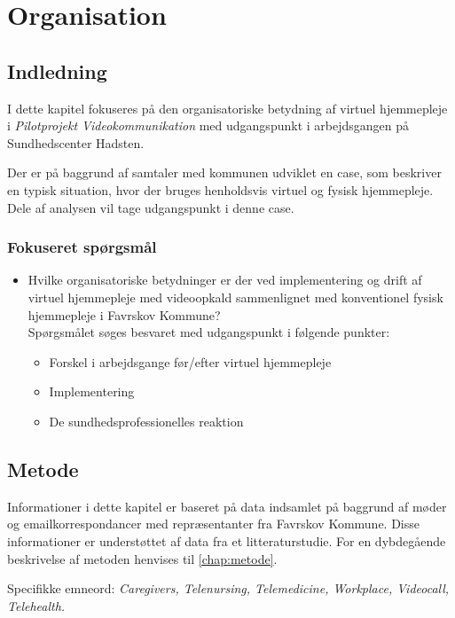 \chapter{Organisation}

\section{Indledning}
I dette kapitel fokuseres på den organisatoriske betydning af virtuel hjemmepleje i \textit{Pilotprojekt Videokommunikation} med udgangspunkt i arbejdsgangen på Sundhedscenter Hadsten. 

Der er på baggrund af samtaler med kommunen udviklet en case, som beskriver en typisk situation, hvor der bruges henholdsvis virtuel og fysisk hjemmepleje. Dele af analysen vil tage udgangspunkt i denne case. 

\subsection{Fokuseret spørgsmål}

\begin{itemize}
	\item Hvilke organisatoriske betydninger er der ved implementering og drift af virtuel hjemmepleje med videoopkald sammenlignet med konventionel fysisk hjemmepleje i Favrskov Kommune? \\Spørgsmålet søges besvaret med udgangspunkt i følgende punkter:
	\begin{itemize}
	\item Forskel i arbejdsgange før/efter virtuel hjemmepleje
	\item Implementering
	\item De sundhedsprofessionelles reaktion
\end{itemize}
\end{itemize}


\section{Metode}
Informationer i dette kapitel er baseret på data indsamlet på baggrund af møder og emailkorrespondancer med repræsentanter fra Favrskov Kommune. Disse informationer er understøttet af data fra et litteraturstudie.  For en dybdegående beskrivelse af metoden henvises til \vref{chap:metode}.

Specifikke emneord: \textit{Caregivers, Telenursing, Telemedicine, Workplace, Videocall, Telehealth.}

